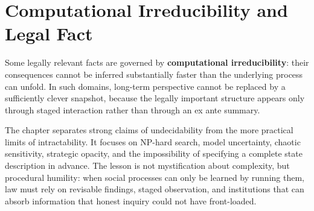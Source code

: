 
\chapter{Computational Irreducibility and Legal Fact}
\label{ch:ch015}

Some legally relevant facts are governed by \textbf{computational irreducibility}: their consequences cannot be inferred substantially faster than the underlying process can unfold. In such domains, long-term perspective cannot be replaced by a sufficiently clever snapshot, because the legally important structure appears only through staged interaction rather than through an ex ante summary.

The chapter separates strong claims of undecidability from the more practical limits of intractability. It focuses on NP-hard search, model uncertainty, chaotic sensitivity, strategic opacity, and the impossibility of specifying a complete state description in advance. The lesson is not mystification about complexity, but procedural humility: when social processes can only be learned by running them, law must rely on revisable findings, staged observation, and institutions that can absorb information that honest inquiry could not have front-loaded.
